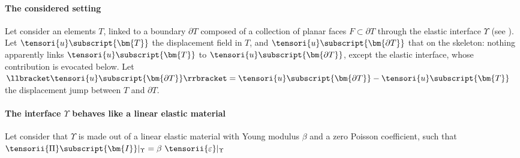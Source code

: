         \paragraph{The considered setting}
        Let consider an elements $T$, linked to a boundary $\partial T$ composed of a collection of planar faces $F \subset \partial T$ through the elastic interface $\Upsilon$ (see ).
        Let $\tensori{u}\subscript{\bm{T}}$ the displacement field in $T$, and $\tensori{u}\subscript{\bm{\partial T}}$ that on the skeleton: nothing apparently links $\tensori{u}\subscript{\bm{T}}$ to $\tensori{u}\subscript{\bm{\partial T}}$, except the elastic interface, whose contribution is evocated below.
        Let $\llbracket \tensori{u}\subscript{\bm{\partial T}} \rrbracket = \tensori{u}\subscript{\bm{\partial T}} - \tensori{u}\subscript{\bm{T}}$ the displacement jump between $T$ and $\partial T$.

        \paragraph{The interface $\Upsilon$ behaves like a linear elastic material}
        Let consider that $\Upsilon$ is made out of a linear elastic material with Young modulus $\beta$ and a zero Poisson coefficient, such that $\tensorii{\Pi}\subscript{\bm{I}} \vert_\Upsilon = \beta \ \tensorii{\varepsilon} \vert_{\Upsilon}$

